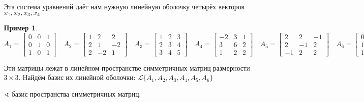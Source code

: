\documentclass{book}
\theoremstyle{definition}
\newtheorem*{example}{Пример}
\begin{document}
    Эта система уравнений даёт нам нужную линейную оболочку четырёх векторов $x_1, x_2, x_3, x_4$

    \begin{example}
        $A_1 = \begin{bmatrix} 0&0&1\\0&1&0\\1&0&1 \end{bmatrix} \quad A_2 = \begin{bmatrix} 1&2&2\\2&1&-2\\2&-2&1 \end{bmatrix} \quad A_3 = \begin{bmatrix} 1&2&3\\2&3&4\\3&4&5 \end{bmatrix} \quad A_4 = \begin{bmatrix} -2&3&1\\3&6&2\\1&2&2 \end{bmatrix} \quad A_5 = \begin{bmatrix} 2&2&-1\\2&-1&2\\-1&2&2 \end{bmatrix} \quad A_6 = \begin{bmatrix} 0&1&1\\1&-1&-1\\1&-1&-2 \end{bmatrix} $

        Эти матрицы лежат в линейном пространстве симметричных матриц размерности $3\times 3$. Найдём базис их линейной оболочки:  $\mathcal{L}\{A_1, A_2, A_3, A_4, A_5, A_6\}$

        $\sphericalangle $ базис пространства симметричных матриц:


\end{example}
\end{document}
